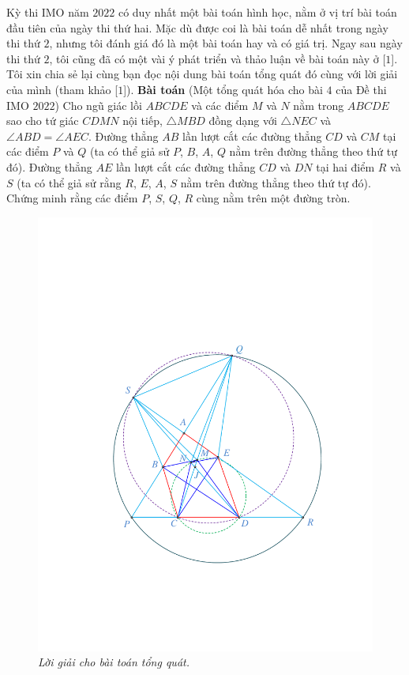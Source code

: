\begin{multicols}{2}
	Kỳ thi IMO năm $2022$ có duy nhất một bài toán hình học, nằm ở vị trí bài toán đầu tiên của ngày thi thứ hai. Mặc dù được coi là bài toán dễ nhất trong ngày thi thứ $2$, nhưng tôi đánh giá đó là một bài toán hay và có giá trị. Ngay sau ngày thi thứ $2$, tôi cũng đã có một vài ý phát triển và thảo luận về bài toán này ở [$1$]. Tôi xin chia sẻ lại cùng bạn đọc nội dung bài toán tổng quát đó cùng với lời giải của mình (tham khảo [$1$]).
	\vskip 0.05cm
	\textbf{\color{cackithi}Bài toán} (Một tổng quát hóa cho bài $4$ của Đề thi IMO $2022$) Cho ngũ giác lồi $ABCDE$ và các điểm $M$ và $N$ nằm trong $ABCDE$ sao cho tứ giác $CDMN$ nội tiếp, $\triangle MBD$ đồng dạng với $\triangle NEC$ và $\angle ABD=\angle AEC$. Đường thẳng $AB$ lần lượt cắt các đường thẳng $CD$ và $CM$ tại các điểm $P$ và $Q$ (ta có thể giả sử $P$, $B$, $A$, $Q$ nằm trên đường thẳng theo thứ tự đó). Đường thẳng $AE$ lần lượt cắt các đường thẳng $CD$ và $DN$ tại hai điểm $R$ và $S$ (ta có thể giả sử rằng $R$, $E$, $A$, $S$ nằm trên đường thẳng theo thứ tự đó). Chứng minh rằng các điểm $P$, $S$, $Q$, $R$ cùng nằm trên một đường tròn.
	\begin{figure}[H]
		\vspace*{-5pt}
		\centering
		\captionsetup{labelformat= empty, justification=centering}
		\includegraphics[width= 0.7\linewidth]{figure8082}
		\caption{\small\textit{\color{cackithi}Lời giải cho bài toán tổng quát.}}
		\vspace*{-10pt}
	\end{figure}

\end{multicols}
